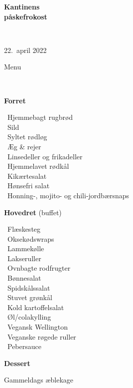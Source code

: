 \begin{center}
\begin{HUGE}
\textbf{Kantinens \\[3mm] påskefrokost}
\end{HUGE}
\\[.6cm]
\begin{Large}
22.~april 2022
\end{Large}
\end{center}
\vspace*{.01cm}
\begin{center}
\begin{huge}
Menu
\end{huge}
\\[.1cm]
\end{center}
\newcommand{\course}[1]{\vspace*{4mm} \textbf{#1} \vspace{-7mm}}
\newcommand{\goodindent}{\null\hspace{23mm}}
{\small
\vspace{-0.5cm}
\begin{center}
\course{Forret}
\end{center}
  \goodindent~Hjemmebagt rugbrød
\\\goodindent~Sild
\\\goodindent~Syltet rødløg
\\\goodindent~Æg \& rejer
\\\goodindent~Linsedeller og frikadeller
\\\goodindent~Hjemmelavet rødkål
\\\goodindent~Kikærtesalat
\\\goodindent~Hønsefri salat
\\\goodindent~Honning-, mojito- og chili-jordbærsnaps

\begin{center}
\vspace{-0.2cm}
\course{Hovedret} (buffet)
\end{center}
  \goodindent~Flæskesteg
\\\goodindent~Oksekødswraps
\\\goodindent~Lammekølle
\\\goodindent~Lakseruller
\\\goodindent~Ovnbagte rodfrugter
\\\goodindent~Bønnesalat
\\\goodindent~Spidskålssalat
\\\goodindent~Stuvet grønkål
\\\goodindent~Kold kartoffelsalat
\\\goodindent~Øl/colakylling
\\\goodindent~Vegansk Wellington
\\\goodindent~Veganske røgede ruller
\\\goodindent~Pebersauce

\begin{center}
\vspace{-0.2cm}
\course{Dessert}
\end{center}
  \goodindent Gammeldags æblekage
}
